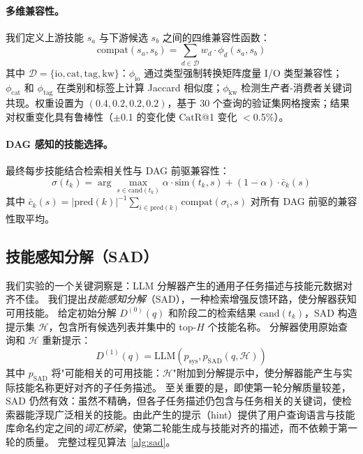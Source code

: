 \documentclass[11pt,a4paper]{ctexart}
\newcommand{\catrecall}{\text{CatR}}
\begin{document}
\paragraph{多维兼容性。}
我们定义上游技能 $s_a$ 与下游候选 $s_b$ 之间的四维兼容性函数：
\begin{equation}
\text{compat}(s_a, s_b) = \sum_{d \in \mathcal{D}} w_d \cdot \phi_d(s_a, s_b)
\label{eq:compat}
\end{equation}
其中 $\mathcal{D} = \{\text{io}, \text{cat}, \text{tag}, \text{kw}\}$：$\phi_\text{io}$ 通过类型强制转换矩阵度量 I/O 类型兼容性；$\phi_\text{cat}$ 和 $\phi_\text{tag}$ 在类别和标签上计算 Jaccard 相似度；$\phi_\text{kw}$ 检测生产者-消费者关键词共现。权重设置为 $(0.4, 0.2, 0.2, 0.2)$，基于 30 个查询的验证集网格搜索；结果对权重变化具有鲁棒性（$\pm$0.1 的变化使 $\catrecall$@1 变化 $<$0.5\%）。

\paragraph{DAG 感知的技能选择。}
最终每步技能结合检索相关性与 DAG 前驱兼容性：
\begin{equation}
\sigma(t_k) = \arg\max_{s \in \text{cand}(t_k)} \alpha \!\cdot\! \text{sim}(t_k, s) + (1\!-\!\alpha) \!\cdot\! \bar{c}_k(s)
\label{eq:selection}
\end{equation}
其中 $\bar{c}_k(s) = |\text{pred}(k)|^{-1}\!\sum_{i \in \text{pred}(k)} \text{compat}(\sigma_i, s)$ 对所有 DAG 前驱的兼容性取平均。

\subsection{技能感知分解（SAD）}
\label{sec:sad}

我们实验的一个关键洞察是：LLM 分解器产生的通用子任务描述与技能元数据对齐不佳。
我们提出\emph{技能感知分解}（SAD），一种检索增强反馈环路，使分解器获知可用技能。
给定初始分解 $D^{(0)}(q)$ 和阶段二的检索结果 $\text{cand}(t_k)$，SAD 构造提示集 $\mathcal{H}$，包含所有候选列表并集中的 top-$H$ 个技能名称。
分解器使用原始查询和 $\mathcal{H}$ 重新提示：
\begin{equation}
D^{(1)}(q) = \text{LLM}(p_{\text{sys}}, p_{\text{SAD}}(q, \mathcal{H}))
\end{equation}
其中 $p_{\text{SAD}}$ 将"可能相关的可用技能：$\mathcal{H}$"附加到分解提示中，使分解器能产生与实际技能名称更好对齐的子任务描述。
至关重要的是，即使第一轮分解质量较差，SAD 仍然有效：虽然不精确，但各子任务描述仍包含与任务相关的关键词，使检索器能浮现广泛相关的技能。由此产生的提示（hint）提供了用户查询语言与技能库命名约定之间的\emph{词汇桥梁}，使第二轮能生成与技能对齐的描述，而不依赖于第一轮的质量。
完整过程见算法~\ref{alg:sad}。
\end{document}
